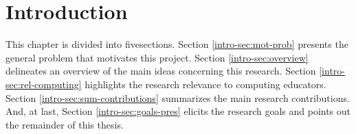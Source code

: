 \chapter{Introduction}
\label{chap:intro}

This chapter is divided into fivesections. Section \ref{intro-sec:mot-prob} presents the general problem that motivates this project. Section \ref{intro-sec:overview} delineates an overview of the main ideas concerning this research. Section \ref{intro-sec:rel-computing} highlights the research relevance to computing educators. Section \ref{intro-sec:sum-contributions} summarizes the main research contributions. And, at last, Section \ref{intro-sec:goals-pres} elicits the research goals and points out the remainder of this thesis.